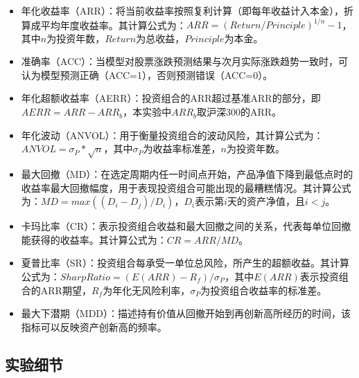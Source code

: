 \begin{itemize}[topsep = 0 pt, itemsep= 0 pt, parsep=0pt, partopsep=0pt, leftmargin=36pt, itemindent=0pt, labelsep=6pt, listparindent=24pt]
	\item 年化收益率（ARR）：将当前收益率按照复利计算（即每年收益计入本金），折算成平均年度收益率。其计算公式为：$ARR = (Return / Principle)^{1/n} - 1$，其中$n$为投资年数，$Return$为总收益，$Principle$为本金。
	\item 准确率（ACC）：当模型对股票涨跌预测结果与次月实际涨跌趋势一致时，可认为模型预测正确（ACC=1），否则预测错误（ACC=0）。
	\item 年化超额收益率（AERR）：投资组合的ARR超过基准ARR的部分，即$AERR = ARR - ARR_{b}$，本实验中$ARR_{b}$取沪深300的ARR。
	\item 年化波动（ANVOL）：用于衡量投资组合的波动风险，其计算公式为：$ANVOL = \sigma_P * \sqrt{n}$，其中$\sigma_P$为收益率标准差，$n$为投资年数。
	\item 最大回撤（MD）：在选定周期内任一时间点开始，产品净值下降到最低点时的收益率最大回撤幅度，用于表现投资组合可能出现的最糟糕情况。其计算公式为：$MD = max((D_i - D_j) / D_i)$，$D_i$表示第$i$天的资产净值，且$i < j$。
	\item 卡玛比率（CR）：表示投资组合收益和最大回撤之间的关系，代表每单位回撤能获得的收益率。其计算公式为：$CR = ARR / MD$。
	\item 夏普比率（SR）：投资组合每承受一单位总风险，所产生的超额收益。其计算公式为：$SharpRatio = (E(ARR) - R_f)/\sigma_P$，其中$E(ARR)$表示投资组合的ARR期望，$R_f$为年化无风险利率，$\sigma_P$为投资组合收益率的标准差。
	\item 最大下潜期（MDD）：描述持有价值从回撤开始到再创新高所经历的时间，该指标可以反映资产创新高的频率。
\end{itemize}

\subsection{实验细节}


